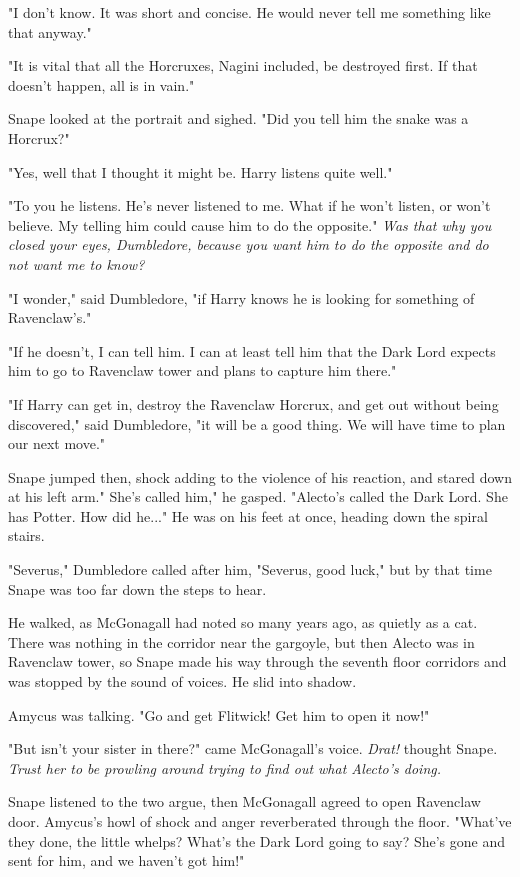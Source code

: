 "I don't know. It was short and concise. He would never tell me something like that anyway."

"It is vital that all the Horcruxes, Nagini included, be destroyed first. If that doesn't happen, all is in vain."

Snape looked at the portrait and sighed. "Did you tell him the snake was a Horcrux?"

"Yes, well that I thought it might be. Harry listens quite well."

"To you he listens. He's never listened to me. What if he won't listen, or won't believe. My telling him could cause him to do the opposite." \emph{Was that why you closed your eyes, Dumbledore, because you want him to do the opposite and do not want me to know?}

"I wonder," said Dumbledore, "if Harry knows he is looking for something of Ravenclaw's."

"If he doesn't, I can tell him. I can at least tell him that the Dark Lord expects him to go to Ravenclaw tower and plans to capture him there."

"If Harry can get in, destroy the Ravenclaw Horcrux, and get out without being discovered," said Dumbledore, "it will be a good thing. We will have time to plan our next move."

Snape jumped then, shock adding to the violence of his reaction, and stared down at his left arm." She's called him," he gasped. "Alecto's called the Dark Lord. She has Potter. How did he..." He was on his feet at once, heading down the spiral stairs.

"Severus," Dumbledore called after him, "Severus, good luck," but by that time Snape was too far down the steps to hear.

He walked, as McGonagall had noted so many years ago, as quietly as a cat. There was nothing in the corridor near the gargoyle, but then Alecto was in Ravenclaw tower, so Snape made his way through the seventh floor corridors and was stopped by the sound of voices. He slid into shadow.

Amycus was talking. "Go and get Flitwick! Get him to open it now!"

"But isn't your sister in there?" came McGonagall's voice. \emph{Drat!} thought Snape. \emph{Trust her to be prowling around trying to find out what Alecto's doing.}

Snape listened to the two argue, then McGonagall agreed to open Ravenclaw door. Amycus's howl of shock and anger reverberated through the floor. "What've they done, the little whelps? What's the Dark Lord going to say? She's gone and sent for him, and we haven't got him!"

